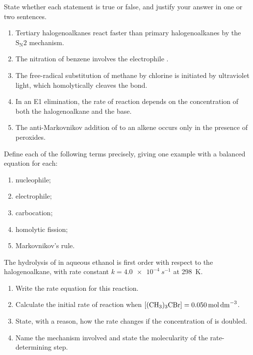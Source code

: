 \documentclass[11pt]{article}
\begin{document}
\begin{exercice}
State whether each statement is true or false, and justify your answer in one or two sentences.
\begin{enumerate}
\item Tertiary halogenoalkanes react faster than primary halogenoalkanes by the $\mathrm{S_N2}$ mechanism.
\item The nitration of benzene involves the electrophile .
\item The free-radical substitution of methane by chlorine is initiated by ultraviolet light, which homolytically cleaves the  bond.
\item In an E1 elimination, the rate of reaction depends on the concentration of both the halogenoalkane and the base.
\item The anti-Markovnikov addition of  to an alkene occurs only in the presence of peroxides.
\end{enumerate}
\end{exercice}

\begin{exercice}[Definitions]
Define each of the following terms precisely, giving one example with a balanced equation for each:
\begin{enumerate}
\item nucleophile;
\item electrophile;
\item carbocation;
\item homolytic fission;
\item Markovnikov's rule.
\end{enumerate}
\end{exercice}

\begin{exercice}
The hydrolysis of  in aqueous ethanol is first order with respect to the halogenoalkane, with rate constant $k = \SI{4.0e-4}{s^{-1}}$ at \SI{298}{K}.
\begin{enumerate}
\item Write the rate equation for this reaction.
\item Calculate the initial rate of reaction when $[\ce{(CH3)3CBr}] = \SI{0.050}{mol.dm^{-3}}$.
\item State, with a reason, how the rate changes if the concentration of  is doubled.
\item Name the mechanism involved and state the molecularity of the rate-determining step.
\end{enumerate}
\end{exercice}
\end{document}
